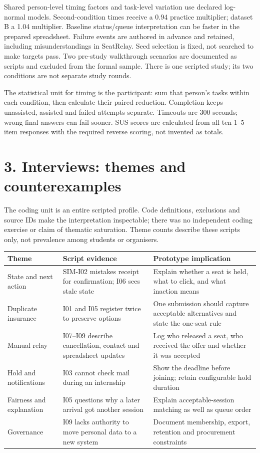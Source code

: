 \documentclass[a4paper,11pt]{article}
\begin{document}
Shared person-level timing factors and task-level variation use declared log-normal models.
Second-condition times receive a 0.94 practice multiplier; dataset B a 1.04 multiplier. Baseline
status/queue interpretation can be faster in the prepared spreadsheet. Failure events are authored
in advance and retained, including misunderstandings in SeatRelay. Seed selection is fixed, not
searched to make targets pass. Two pre-study walkthrough scenarios are documented as scripts and excluded from the formal sample. There is one scripted study; its two conditions are not separate study rounds.

The statistical unit for timing is the participant: sum that person's tasks within each
condition, then calculate their paired reduction. Completion keeps unassisted, assisted and failed
attempts separate. Timeouts are 300 seconds; wrong final answers can fail sooner. SUS scores are
calculated from all ten 1--5 item responses with the required reverse scoring, not invented as totals.

\newpage
\section*{3. Interviews: themes and counterexamples}
The coding unit is an entire scripted profile. Code definitions, exclusions and source IDs make the
interpretation inspectable; there was no independent coding exercise or claim of thematic saturation.
Theme counts describe these scripts only, not prevalence among students or organisers.

\begin{tabularx}{\textwidth}{@{}p{3.2cm}LL@{}}
\toprule
Theme & Script evidence & Prototype implication\\
\midrule
State and next action & SIM-I02 mistakes receipt for confirmation; I06 sees stale state & Explain whether a seat is held, what to click, and what inaction means\\
Duplicate insurance & I01 and I05 register twice to preserve options & One submission should capture acceptable alternatives and state the one-seat rule\\
Manual relay & I07--I09 describe cancellation, contact and spreadsheet updates & Log who released a seat, who received the offer and whether it was accepted\\
Hold and notifications & I03 cannot check mail during an internship & Show the deadline before joining; retain configurable hold duration\\
Fairness and explanation & I05 questions why a later arrival got another session & Explain acceptable-session matching as well as queue order\\
Governance & I09 lacks authority to move personal data to a new system & Document membership, export, retention and procurement constraints\\
\bottomrule
\end{tabularx}
\end{document}

